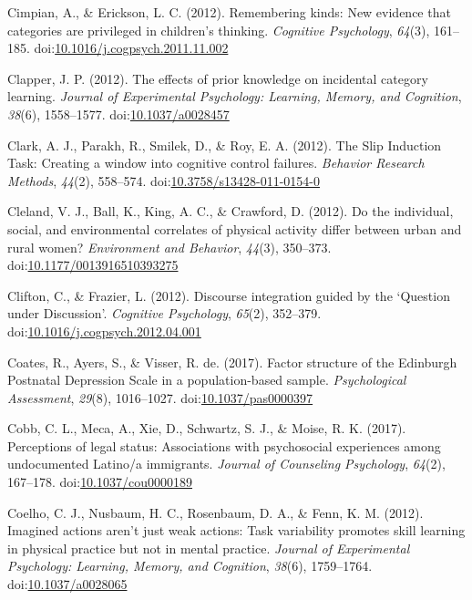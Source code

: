 \documentclass[english,man]{apa6}
\begin{document}
\hypertarget{ref-Cimpian2012}{}
Cimpian, A., \& Erickson, L. C. (2012). Remembering kinds: New evidence
that categories are privileged in children's thinking. \emph{Cognitive
Psychology}, \emph{64}(3), 161--185.
doi:\href{https://doi.org/10.1016/j.cogpsych.2011.11.002}{10.1016/j.cogpsych.2011.11.002}

\hypertarget{ref-Clapper2012}{}
Clapper, J. P. (2012). The effects of prior knowledge on incidental
category learning. \emph{Journal of Experimental Psychology: Learning,
Memory, and Cognition}, \emph{38}(6), 1558--1577.
doi:\href{https://doi.org/10.1037/a0028457}{10.1037/a0028457}

\hypertarget{ref-Clark2012}{}
Clark, A. J., Parakh, R., Smilek, D., \& Roy, E. A. (2012). The Slip
Induction Task: Creating a window into cognitive control failures.
\emph{Behavior Research Methods}, \emph{44}(2), 558--574.
doi:\href{https://doi.org/10.3758/s13428-011-0154-0}{10.3758/s13428-011-0154-0}

\hypertarget{ref-Cleland2012}{}
Cleland, V. J., Ball, K., King, A. C., \& Crawford, D. (2012). Do the
individual, social, and environmental correlates of physical activity
differ between urban and rural women? \emph{Environment and Behavior},
\emph{44}(3), 350--373.
doi:\href{https://doi.org/10.1177/0013916510393275}{10.1177/0013916510393275}

\hypertarget{ref-Clifton2012}{}
Clifton, C., \& Frazier, L. (2012). Discourse integration guided by the
`Question under Discussion'. \emph{Cognitive Psychology}, \emph{65}(2),
352--379.
doi:\href{https://doi.org/10.1016/j.cogpsych.2012.04.001}{10.1016/j.cogpsych.2012.04.001}

\hypertarget{ref-Coates2016}{}
Coates, R., Ayers, S., \& Visser, R. de. (2017). Factor structure of the
Edinburgh Postnatal Depression Scale in a population-based sample.
\emph{Psychological Assessment}, \emph{29}(8), 1016--1027.
doi:\href{https://doi.org/10.1037/pas0000397}{10.1037/pas0000397}

\hypertarget{ref-Cobb2017}{}
Cobb, C. L., Meca, A., Xie, D., Schwartz, S. J., \& Moise, R. K. (2017).
Perceptions of legal status: Associations with psychosocial experiences
among undocumented Latino/a immigrants. \emph{Journal of Counseling
Psychology}, \emph{64}(2), 167--178.
doi:\href{https://doi.org/10.1037/cou0000189}{10.1037/cou0000189}

\hypertarget{ref-Coelho2012}{}
Coelho, C. J., Nusbaum, H. C., Rosenbaum, D. A., \& Fenn, K. M. (2012).
Imagined actions aren't just weak actions: Task variability promotes
skill learning in physical practice but not in mental practice.
\emph{Journal of Experimental Psychology: Learning, Memory, and
Cognition}, \emph{38}(6), 1759--1764.
doi:\href{https://doi.org/10.1037/a0028065}{10.1037/a0028065}
\end{document}
